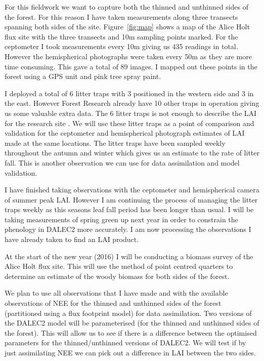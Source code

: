 \documentclass[11pt]{article}
\begin{document}
For this fieldwork we want to capture both the thinned and unthinned sides of the forest. For this reason I have taken measurements along three transects spanning both sides of the site. Figure~\ref{fig:map} shows a map of the Alice Holt flux site with the three transects and 10m sampling points marked. For the ceptometer I took measurements every 10m giving us 435 readings in total. However the hemispherical photographs were taken every 50m as they are more time consuming. This gave a total of 89 images. I mapped out these points in the forest using a GPS unit and pink tree spray paint. 

I deployed a total of 6 litter traps with 3 positioned in the western side and 3 in the east. However Forest Research already have 10 other traps in operation giving us some valuable extra data. The 6 litter traps is not enough to describe the LAI for the research site \citep{kimmins1973some}. We will use these litter traps as a point of comparison and validation for the ceptometer and hemispherical photograph estimates of LAI made at the same locations. The litter traps have been sampled weekly throughout the autumn and winter which gives us an estimate to the rate of litter fall. This is another observation we can use for data assimilation and model validation.

I have finished taking observations with the ceptometer and hemispherical camera of summer peak LAI. However I am continuing the process of managing the litter traps weekly as this seasons leaf fall period has been longer than usual. I will be taking measurements of spring green up next year in order to constrain the phenology in DALEC2 more accurately. I am now processing the observations I have already taken to find an LAI product. 

At the start of the new year (2016) I will be conducting a biomass survey of the Alice Holt flux site. This will use the method of point centred quarters \citep{dahdouh2006empirical} to determine an estimate of the woody biomass for both sides of the forest. 

We plan to use all observations that I have made and with the available observations of NEE for the thinned and unthinned sides of the forest (partitioned using a flux footprint model) for data assimilation. Two versions of the DALEC2 model will be parameterised (for the thinned and unthinned sides of the forest). This will allow us to see if there is a difference between the optimised parameters for the thinned/unthinned versions of DALEC2. We will test if by just assimilating NEE we can pick out a difference in LAI between the two sides. 
\end{document}
